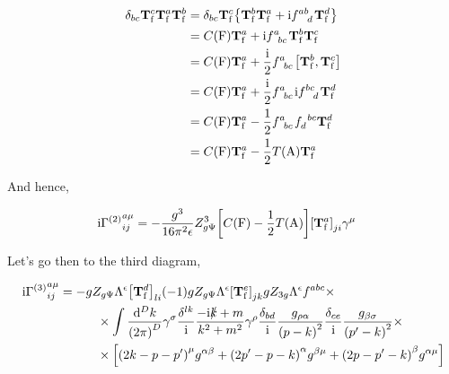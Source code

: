 \begin{align}
    \delta_{bc}{\vb T^c_{\textnormal{f}}}{\vb T^a_{\textnormal{f}}}{\vb T^b_{\textnormal{f}}}&=\delta_{bc}{\vb T^c_{\textnormal{f}}}\qty{{\vb T^b_{\textnormal{f}}}{\vb T^a_{\textnormal{f}}}+\im \tensor{f}{^a^b_d}{\vb T^d_{\textnormal{f}}}}\nonumber\\
    &=C\qty(\textnormal F){\vb T^a_{\textnormal{f}}}+\im\tensor{f}{^a_b_c}\vb T^b_{\textnormal f}\vb T^c_{\textnormal f}\nonumber\\
    &=C\qty(\textnormal F){\vb T^a_{\textnormal{f}}}+\frac\im2\tensor{f}{^a_b_c}\comm{\vb T^b_{\textnormal f}}{\vb T^c_{\textnormal f}}\nonumber\\
    &=C\qty(\textnormal F){\vb T^a_{\textnormal{f}}}+\frac\im2\tensor{f}{^a_b_c}\im\tensor{f}{^b^c_d}\vb T^d_{\textnormal f}\nonumber\\
    &=C\qty(\textnormal F){\vb T^a_{\textnormal{f}}}-\frac12\tensor{f}{^a_b_c}\tensor{f}{_d^b^c}\vb T^d_{\textnormal f}\nonumber\\
    &=C\qty(\textnormal F){\vb T^a_{\textnormal{f}}}-\frac12T\qty(\textnormal{A})\vb T^a_{\textnormal f}\nonumber
\end{align}

And hence,

\begin{align}
    \textnormal{i}{\Gamma^{\qty(2)}}^{a\mu}_{ij}&=-\frac{g^3}{16\pi^2\epsilon} Z_{g\Psi}^3
    \qty[C\qty(\textnormal F)-\frac12T\qty(\textnormal{A})]\qty[{\vb T^a_{\textnormal{f}}}]_{ji}\gamma^\mu\nonumber
\end{align}

Let's go then to the third diagram,

\begin{align}
    \textnormal{i}{\Gamma^{\qty(3)}}^{a\mu}_{ij}&=-gZ_{g\Psi}\Lambda^\epsilon\qty[\vb T^d_{\textnormal f}]_{li}
    \qty(-1)gZ_{g\Psi}\Lambda^\epsilon\qty[\vb T^e_{\textnormal f}]_{jk}gZ_{3g}\Lambda^\epsilon f^{abc}\times\nonumber\\
    &\quad\quad\quad\times\int\frac{\dd[D]{k}}{\qty(2\pi)^D}\gamma^\sigma
    \frac{\delta^{lk}}{\textnormal{i}}\frac{-\textnormal{i}\slashed k+m}{k^2+m^2}\gamma^\rho
    \frac{\delta_{bd}}{\textnormal{i}}\frac{g_{\rho\alpha}}{\qty(p-k)^2}
    \frac{\delta_{ce}}{\textnormal{i}}\frac{g_{\beta\sigma}}{\qty(p'-k)^2}\times\nonumber\\
    &\quad\quad\quad\times\qty[\qty(2k-p-p')^\mu g^{\alpha\beta}
    +\qty(2p'-p-k)^\alpha g^{\beta\mu}+\qty(2p-p'-k)^\beta g^{\alpha\mu}]\nonumber
\end{align}


